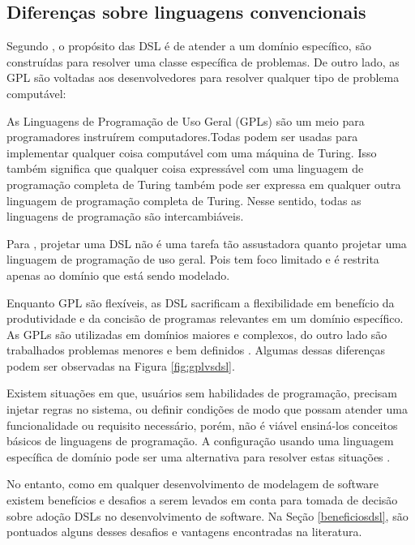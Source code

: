 \subsection{Diferenças sobre linguagens convencionais}
\label{diferencasdsl}

Segundo , o propósito das \gls{DSL} é de atender a um domínio específico, são construídas para resolver uma classe específica de problemas. De outro lado, as \gls{GPL} são voltadas aos desenvolvedores para resolver qualquer tipo de problema computável:

\begin{citacao}
As Linguagens de Programação de Uso Geral (GPLs) são um meio para programadores instruírem computadores.Todas podem ser usadas para implementar qualquer coisa computável com uma máquina de Turing. Isso também significa que qualquer coisa expressável com uma linguagem de programação completa de Turing também pode ser expressa em qualquer outra linguagem de programação completa de Turing. Nesse sentido, todas as linguagens de programação são intercambiáveis. \cite[p.27, tradução nossa]{dslengineering}
\end{citacao}

Para , projetar uma \gls{DSL} não é uma tarefa tão assustadora quanto projetar uma linguagem de programação de uso geral. Pois tem foco limitado e é restrita apenas ao domínio que está sendo modelado.

Enquanto \gls{GPL} são flexíveis, as \gls{DSL} sacrificam a flexibilidade em benefício da produtividade e da concisão de programas relevantes em um domínio específico. As \gls{GPL}s são utilizadas em domínios maiores e complexos, do outro lado são trabalhados problemas menores e bem definidos \cite{dslengineering}. Algumas dessas diferenças podem ser observadas na  Figura \ref{fig:gplvsdsl}.



Existem situações em que, usuários sem habilidades de programação, precisam injetar regras no sistema, ou definir condições de modo que possam atender uma funcionalidade ou requisito necessário, porém, não é viável ensiná-los conceitos básicos de linguagens de programação. A configuração usando uma linguagem específica de domínio pode ser uma alternativa para resolver estas situações \cite{novak2010easy}.  

No entanto, como em qualquer desenvolvimento de modelagem de software existem benefícios e desafios a serem levados em conta para tomada de decisão sobre adoção \gls{DSL}s no desenvolvimento de software. Na Seção \ref{beneficiosdsl}, são pontuados alguns desses desafios e vantagens encontradas na literatura.

